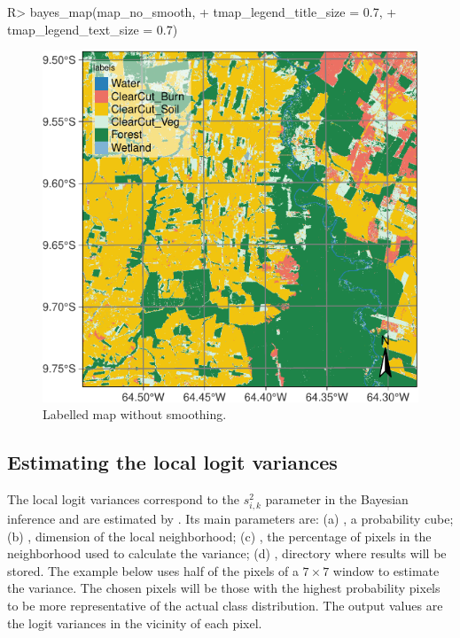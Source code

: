\documentclass[
  shortnames]{jss}
\begin{document}
\begin{CodeChunk}
\begin{CodeInput}
R> bayes_map(map_no_smooth, 
+           tmap_legend_title_size = 0.7,
+           tmap_legend_text_size = 0.7)
\end{CodeInput}
\begin{figure}[h]

{\centering \includegraphics{Bayesian_smoothing_JSS_files/figure-latex/map1-1} 

}

\caption[Labelled map without smoothing]{Labelled map without smoothing.}\label{fig:map1}
\end{figure}
\end{CodeChunk}

\newpage

\hypertarget{estimating-the-local-logit-variances}{%
\subsection{Estimating the local logit variances}\label{estimating-the-local-logit-variances}}

The local logit variances correspond to the \(s^2_{i,k}\) parameter in the Bayesian inference and are estimated by . Its main parameters are: (a) , a probability cube; (b) , dimension of the local neighborhood; (c) , the percentage of pixels in the neighborhood used to calculate the variance; (d) , directory where results will be stored. The example below uses half of the pixels of a \(7\times 7\) window to estimate the variance. The chosen pixels will be those with the highest probability pixels to be more representative of the actual class distribution. The output values are the logit variances in the vicinity of each pixel.
\end{document}
